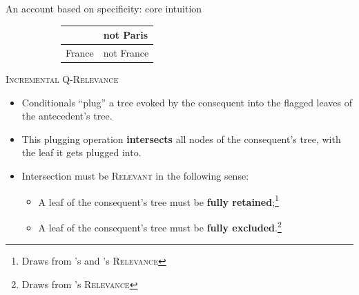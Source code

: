 \documentclass[10pt]{beamer}
\newcommand{\weaker}[1]{\textbf{\textcolor{blue}{#1}}}
\newcommand{\France}{\textbf{\textcolor{blue}{France}}}
\begin{document}
\begin{frame}{An account based on specificity: core intuition}
\begin{figure}[H]
			\hfill
			\begin{subfigure}[t]{.47\linewidth}
				\centering
				\begin{tabular}{llll|}
					\cline{2-4} 
					\multicolumn{1}{l|}{}   & \multicolumn{3}{l|}{\cellcolor{orange!20!white}not Paris}      \\ 
					\hline
					\multicolumn{2}{|l|}{France} & \multicolumn{2}{l|}{not France} \\ \hline
				\end{tabular}
				\label{tab:italy-not-noto-polar-rel}
			\end{subfigure}
		\end{figure}
\end{frame}

\begin{frame}{\textsc{Incremental Q-Relevance}}
	\begin{minipage}{.55\linewidth}
		\begin{itemize}
			\item Conditionals ``plug'' a tree evoked by the consequent into the flagged leaves of the antecedent's tree.
			\item This plugging operation \textbf{intersects} all nodes of the consequent's tree, with the leaf it gets plugged into.
			\item Intersection must be \textsc{Relevant} in the following sense:
			\begin{itemize}
				\item A leaf of the consequent's tree must be \textbf{fully retained};\footnote{Draws from \citet{Lewis1988}'s and \citet{Kriz2020}'s \textsc{Relevance}}
				\item A leaf of the consequent's tree must be \textbf{fully excluded}.\footnote{Draws from \citet{Roberts2012}'s \textsc{Relevance}}
			\end{itemize}
		\end{itemize}
	\end{minipage}
	\hfill
	\begin{minipage}{.4\linewidth}
		\centering
		\begin{figure}[H]
			\centering
			\begin{minipage}{\linewidth}
				\centering
				\scalebox{.8}{
					\begin{forest}
						[CS[\xcancel{\faFlagCheckered}\\\France][\weaker{Italy}][\weaker{...}]]
				\end{forest}}
			\end{minipage}
			\begin{minipage}{\linewidth}

\end{minipage}
\end{figure}
\end{minipage}
\end{frame}
\end{document}
